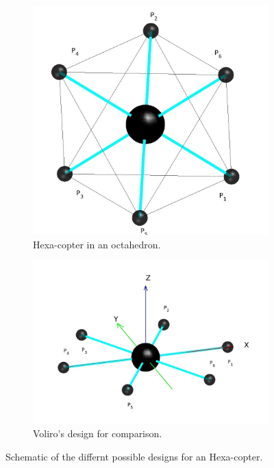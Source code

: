 \begin{figure}[!h]
{\begin{subfigure}[b]{0.5\textwidth}
    \includegraphics[width=\linewidth]{images/Hexa_octahedron.jpg}
    \caption{Hexa-copter in an octahedron.} \label{fig:Hexacopter_resultb}
  \end{subfigure}
  \hspace*{\fill} %
  \begin{subfigure}[b]{0.7\textwidth}
    \includegraphics[width=\linewidth]{images/Voliro.jpg}
    \caption{Voliro's design for comparison.} \label{fig:Hexacopter_resultc}
  \end{subfigure}}
  \caption{Schematic of the differnt possible designs for an Hexa-copter.}
  \label{fig:Hexacopter_result}
\end{figure}


